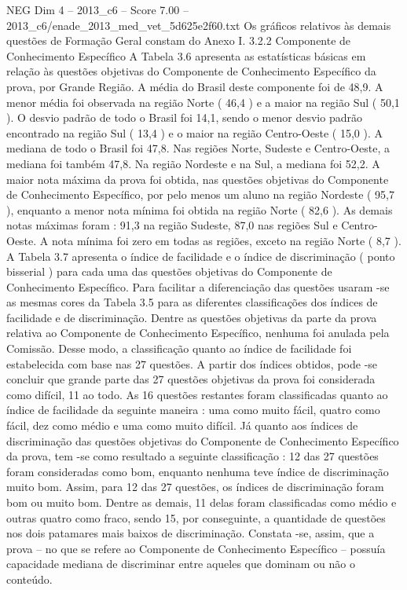 \begin{textsample}{NEG Dim 4 – 2013\_c6 – Score 7.00 – 2013\_c6/enade\_2013\_med\_vet\_5d625e2f60.txt}
Os gráficos relativos às demais questões de Formação Geral constam do Anexo I. 3.2.2 Componente de Conhecimento Específico A Tabela 3.6 apresenta as estatísticas básicas em relação às questões objetivas do Componente de Conhecimento Específico da prova, por Grande Região.
A média do Brasil deste componente foi de 48,9.
A menor média foi observada na região Norte ( 46,4 ) e a maior na região Sul ( 50,1 ).
O desvio padrão de todo o Brasil foi 14,1, sendo o menor desvio padrão encontrado na região Sul ( 13,4 ) e o maior na região Centro-Oeste ( 15,0 ).
A mediana de todo o Brasil foi 47,8.
Nas regiões Norte, Sudeste e Centro-Oeste, a mediana foi também 47,8.
Na região Nordeste e na Sul, a mediana foi 52,2.
A maior nota máxima da prova foi obtida, nas questões objetivas do Componente de Conhecimento Específico, por pelo menos um aluno na região Nordeste ( 95,7 ), enquanto a menor nota mínima foi obtida na região Norte ( 82,6 ).
As demais notas máximas foram : 91,3 na região Sudeste, 87,0 nas regiões Sul e Centro-Oeste.
A nota mínima foi zero em todas as regiões, exceto na região Norte ( 8,7 ).
A Tabela 3.7 apresenta o índice de facilidade e o índice de discriminação ( ponto bisserial ) para cada uma das questões objetivas do Componente de Conhecimento Específico.
Para facilitar a diferenciação das questões usaram -se as mesmas cores da Tabela 3.5 para as diferentes classificações dos índices de facilidade e de discriminação.
Dentre as questões objetivas da parte da prova relativa ao Componente de Conhecimento Específico, nenhuma foi anulada pela Comissão.
Desse modo, a classificação quanto ao índice de facilidade foi estabelecida com base nas 27 questões.
A partir dos índices obtidos, pode -se concluir que grande parte das 27 questões objetivas da prova foi considerada como difícil, 11 ao todo.
As 16 questões restantes foram classificadas quanto ao índice de facilidade da seguinte maneira : uma como muito fácil, quatro como fácil, dez como médio e uma como muito difícil.
Já quanto aos índices de discriminação das questões objetivas do Componente de Conhecimento Específico da prova, tem -se como resultado a seguinte classificação : 12 das 27 questões foram consideradas como bom, enquanto nenhuma teve índice de discriminação muito bom.
Assim, para 12 das 27 questões, os índices de discriminação foram bom ou muito bom.
Dentre as demais, 11 delas foram classificadas como médio e outras quatro como fraco, sendo 15, por conseguinte, a quantidade de questões nos dois patamares mais baixos de discriminação.
Constata -se, assim, que a prova – no que se refere ao Componente de Conhecimento Específico – possuía capacidade mediana de discriminar entre aqueles que dominam ou não o conteúdo.

\end{textsample}
